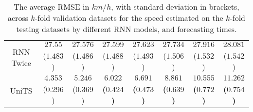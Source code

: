 \begin{table}[!ht]
{\begin{tabular}{|c|c|c|c|c|c|c|c|}
			\multirow{2}{*}{RNN Twice} & $27.55$ & $27.576$ & $27.599$ & $27.623$ & $27.734$ & $27.916$ & $28.081$ \\
			 & ($1.483$) & ($1.486$) & ($1.488$) & ($1.493$) & ($1.506$) & ($1.532$) & ($1.542$) \\ \hline
			\multirow{2}{*}{UniTS} & $4.353$ & $5.246$ & $\mathbf{6.022}$ & $\mathbf{6.691}$ & $\mathbf{8.861}$ & $\mathbf{10.555}$ & $\mathbf{11.262}$ \\
			 & ($0.296$) & ($0.369$) & \textbf{(}$\mathbf{0.424}$\textbf{)} & \textbf{(}$\mathbf{0.473}$\textbf{)} & \textbf{(}$\mathbf{0.639}$\textbf{)} & \textbf{(}$\mathbf{0.772}$\textbf{)} & \textbf{(}$\mathbf{0.754}$\textbf{)} \\ \hline
		\end{tabular}
	}
	\caption{The average RMSE in $km/h$, with standard deviation in brackets, across $k$-fold validation datasets for the speed estimated on the $k$-fold testing datasets by different RNN models, and forecasting times.}
	\label{tab:all_speed_RMSE}
\end{table}